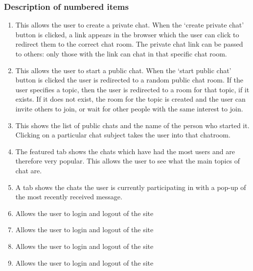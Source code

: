 \documentclass{sig-alt-release2}
\begin{document}
\subsubsection{Description of numbered items}
\begin{enumerate}
\item This allows the user to create a private chat. When the `create private chat' button is clicked, a link appears in the browser which the user can click to redirect them to the correct chat room. The private chat link can be passed to others: only those with the link can chat in that specific chat room. 
\item This allows the user to start a public chat. When the `start public chat' button is clicked the user is redirected to a random public chat room. If the user specifies a topic, then the user is redirected to a room for that topic, if it exists. If it does not exist, the room for the topic is created and the user can invite others to join, or wait for other people with the same interest to join.
\item This shows the list of public chats and the name of the person who started it. Clicking on a particular chat subject takes the user into that chatroom. 
\item The featured tab shows the chats which have had the most users and are therefore very popular. This allows the user to see what the main topics of chat are.
\item A tab shows the chats the user is currently participating in with a pop-up of the most recently received message.
\item Allows the user to login and logout of the site
\item Allows the user to login and logout of the site
\item Allows the user to login and logout of the site
\item Allows the user to login and logout of the site
\end{enumerate}

\end{document}
